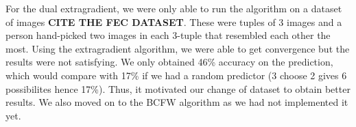 For the dual extragradient, we were only able to run the algorithm on a dataset
of images \textbf{CITE THE FEC DATASET}. These were tuples of 3 images and a person
hand-picked two images in each 3-tuple that resembled each other the most. Using the
extragradient algorithm, we were able to get convergence but the results were not 
satisfying. We only obtained 46\% accuracy on the prediction, which would compare 
with 17\% if we had a random predictor (3 choose 2 gives 6 possibilites hence 17\%).
Thus, it motivated our change of dataset to obtain better results. We also moved on to
the BCFW algorithm as we had not implemented it yet.

